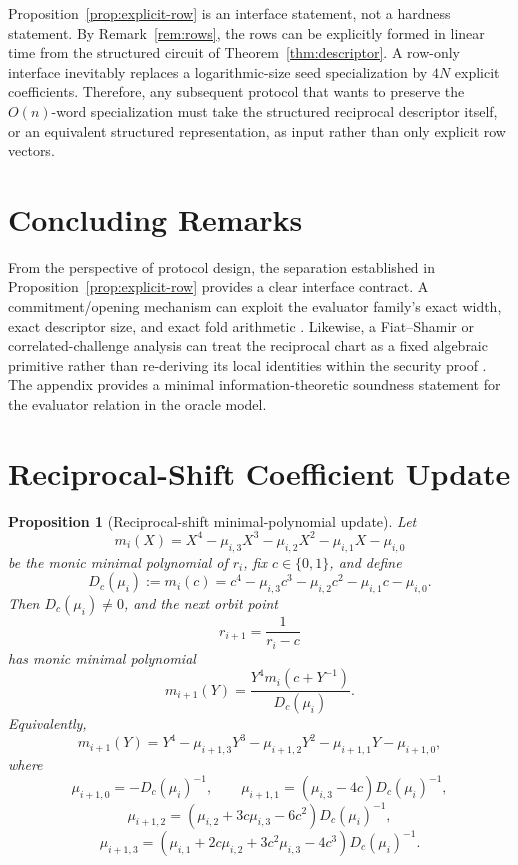 \documentclass[11pt]{article}
\newtheorem{proposition}[theorem]{Proposition}
\begin{document}
Proposition~\ref{prop:explicit-row} is an interface statement, not a hardness statement. By Remark~\ref{rem:rows}, the rows can be explicitly formed in linear time from the structured circuit of Theorem~\ref{thm:descriptor}. A row-only interface inevitably replaces a logarithmic-size seed specialization by \(4N\) explicit coefficients. Therefore, any subsequent protocol that wants to preserve the \(O(n)\)-word specialization must take the structured reciprocal descriptor itself, or an equivalent structured representation, as input rather than only explicit row vectors.

\section{Concluding Remarks}

From the perspective of protocol design, the separation established in Proposition~\ref{prop:explicit-row} provides a clear interface contract. A commitment/opening mechanism can exploit the evaluator family's exact width, exact descriptor size, and exact fold arithmetic \cite{CampanelliEtAl2022LMVC,CatalanoFioreTucker2022AHFC,BalbasCatalanoFioreLai2022CFC,FischLiuVesely2024Orbweaver}. Likewise, a Fiat--Shamir or correlated-challenge analysis can treat the reciprocal chart as a fixed algebraic primitive rather than re-deriving its local identities within the security proof \cite{CanettiEtAl2018FS,BlockEtAl2023FRI}. The appendix provides a minimal information-theoretic soundness statement for the evaluator relation in the oracle model.

\appendix

\section{Reciprocal-Shift Coefficient Update}

\begin{proposition}[Reciprocal-shift minimal-polynomial update]
\label{prop:coeff-update}
Let
\[
m_i(X)=X^4-\mu_{i,3}X^3-\mu_{i,2}X^2-\mu_{i,1}X-\mu_{i,0}
\]
be the monic minimal polynomial of \(r_i\), fix \(c\in\{0,1\}\), and define
\[
D_c(\mu_i):=m_i(c)=c^4-\mu_{i,3}c^3-\mu_{i,2}c^2-\mu_{i,1}c-\mu_{i,0}.
\]
Then \(D_c(\mu_i)\neq 0\), and the next orbit point
\[
r_{i+1}=\frac{1}{r_i-c}
\]
has monic minimal polynomial
\[
m_{i+1}(Y)=\frac{Y^4m_i(c+Y^{-1})}{D_c(\mu_i)}.
\]
Equivalently,
\[
m_{i+1}(Y)=Y^4-\mu_{i+1,3}Y^3-\mu_{i+1,2}Y^2-\mu_{i+1,1}Y-\mu_{i+1,0},
\]
where
\[
\mu_{i+1,0}=-D_c(\mu_i)^{-1},
\qquad
\mu_{i+1,1}=(\mu_{i,3}-4c)D_c(\mu_i)^{-1},
\]
\[
\mu_{i+1,2}=(\mu_{i,2}+3c\mu_{i,3}-6c^2)D_c(\mu_i)^{-1},
\]
\[
\mu_{i+1,3}=(\mu_{i,1}+2c\mu_{i,2}+3c^2\mu_{i,3}-4c^3)D_c(\mu_i)^{-1}.
\]
\end{proposition}
\end{document}
